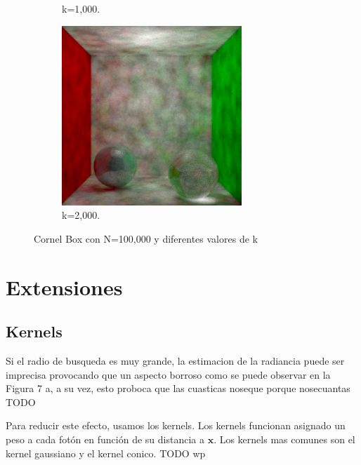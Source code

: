 \documentclass{article}
\begin{document}
\begin{figure}
\begin{subfigure}[h]{0.32\linewidth}
\caption{k=1,000.}
\end{subfigure}
\hfill
\begin{subfigure}[h]{0.32\linewidth}
\includegraphics[width=\linewidth]{imgs/100k2000k.png}
\caption{k=2,000.}
\end{subfigure}

\caption{Cornel Box con N=100,000 y diferentes valores de k}
\end{figure}

\section{Extensiones}
\subsection{Kernels}

Si el radio de busqueda es muy grande, la estimacion de la radiancia puede ser imprecisa provocando que un aspecto borroso como se puede observar en la Figura 7 a, a su vez, esto proboca que las cuasticas noseque porque nosecuantas TODO

Para reducir este efecto, usamos los kernels. Los kernels funcionan asignado un peso a cada fotón en función de su distancia a \(\mathbf{x}\). Los kernels mas comunes son el kernel gaussiano y el kernel conico. TODO wp
\end{document}
